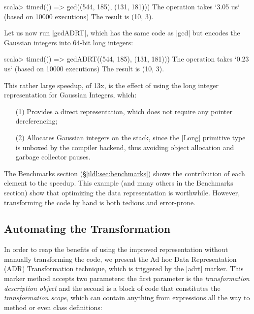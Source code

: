 \begin{lstlisting-nobreak}
scala> timed(() => gcd((544, 185), (131, 181)))
The operation takes `3.05 us` (based on 10000 executions)
The result is (10, 3).
\end{lstlisting-nobreak}

Let us now run |gcdADRT|, which has the same code as |gcd| but encodes the Gaussian integers into 64-bit long integers:

\begin{lstlisting-nobreak}
scala> timed(() => gcdADRT((544, 185), (131, 181)))
The operation takes `0.23 us` (based on 10000 executions)
The result is (10, 3).
\end{lstlisting-nobreak}

This rather large speedup, of 13x, is the effect of using the long integer representation for Gaussian Integers, which:


\begin{itemize}
  \item[(1)] Provides a direct representation, which does not require any pointer dereferencing;
  \item[(2)] Allocates Gaussian integers on the stack, since the |Long| primitive type is unboxed by the compiler backend, thus avoiding object allocation and garbage collector pauses.
\end{itemize}


The Benchmarks section (\S\ref{ildl:sec:benchmarks}) shows the contribution of each element to the speedup. This example (and many others in the Benchmarks section) show that optimizing the data representation is worthwhile. However, transforming the code by hand is both tedious and error-prone. %



\subsection{Automating the Transformation}
\label{ildl:sec:automating}



In order to reap the benefits of using the improved representation without manually transforming the code, we present the Ad hoc Data Representation (ADR) Transformation technique, which is triggered by the |adrt| marker. This marker method accepts two parameters: the first parameter is the \emph{transformation description object} and the second is a block of code that constitutes the \emph{transformation scope}, which can contain anything from expressions all the way to method or even class definitions:

